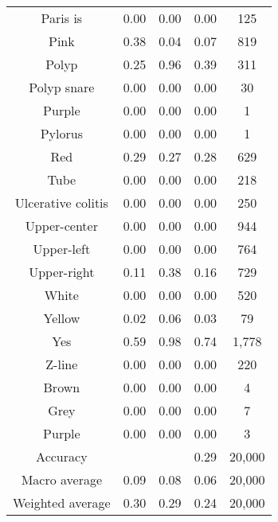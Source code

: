 \begin{center}
\begin{longtable}{|c|c|c|c|c|}
Paris is & 0.00 & 0.00 & 0.00 & 125 \\
Pink & 0.38 & 0.04 & 0.07 & 819 \\
Polyp & 0.25 & 0.96 & 0.39 & 311 \\
Polyp snare & 0.00 & 0.00 & 0.00 & 30 \\
Purple & 0.00 & 0.00 & 0.00 & 1 \\
Pylorus & 0.00 & 0.00 & 0.00 & 1 \\
Red & 0.29 & 0.27 & 0.28 & 629 \\
Tube & 0.00 & 0.00 & 0.00 & 218 \\
Ulcerative colitis & 0.00 & 0.00 & 0.00 & 250 \\
Upper-center & 0.00 & 0.00 & 0.00 & 944 \\
Upper-left & 0.00 & 0.00 & 0.00 & 764 \\
Upper-right & 0.11 & 0.38 & 0.16 & 729 \\
White & 0.00 & 0.00 & 0.00 & 520 \\
Yellow & 0.02 & 0.06 & 0.03 & 79 \\
Yes & 0.59 & 0.98 & 0.74 & 1,778 \\
Z-line & 0.00 & 0.00 & 0.00 & 220 \\
Brown & 0.00 & 0.00 & 0.00 & 4 \\
Grey & 0.00 & 0.00 & 0.00 & 7 \\
Purple & 0.00 & 0.00 & 0.00 & 3 \\
\hline
Accuracy &  &  & 0.29 & 20,000 \\
Macro average & 0.09 & 0.08 & 0.06 & 20,000 \\
Weighted average & 0.30 & 0.29 & 0.24 & 20,000 \\

\end{longtable}
\end{center}